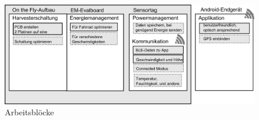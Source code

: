 \begin{figure}[h]
    \includegraphics[width=15cm]{../ressources/Projektorganisation/Arbeitsbloecke.png} 
    \caption{Arbeitsblöcke}
\end{figure}\label{arbeitsbloecke} 

